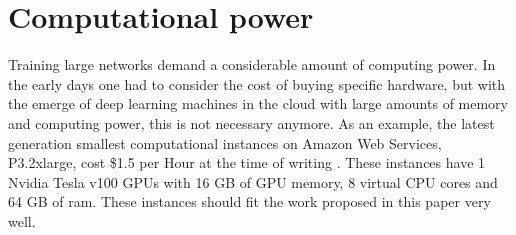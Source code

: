 \section{Computational power}
Training large networks demand a considerable amount of computing power. In the early days one had to consider the cost of buying specific hardware, but with the emerge of deep learning machines in the cloud with large amounts of memory and computing power, this is not necessary anymore. As an example, the latest generation smallest computational instances on Amazon Web Services, P3.2xlarge, cost \$1.5 per Hour at the time of writing \cite{Amazon2017}. These instances have 1 Nvidia Tesla v100 GPUs with 16 GB of GPU memory, 8 virtual CPU cores and 64 GB of ram. These instances should fit the work proposed in this paper very well.